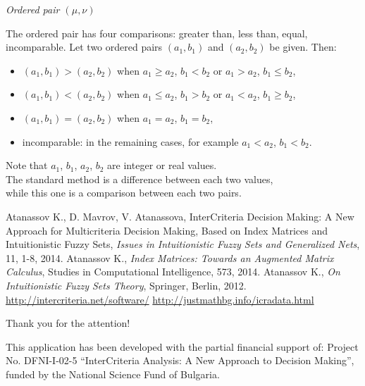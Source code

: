 \documentclass{beamer}
\begin{document}
\begin{frame}
\textit{Ordered pair $(\mu,\nu)$}

\bigskip
The ordered pair has four comparisons: greater than, less than, equal, incomparable.
Let two ordered pairs $(a_1,b_1)$ and $(a_2,b_2)$ be given. Then:
\begin{itemize}
\item $(a_1,b_1) > (a_2,b_2)$ when $a_1 \geq a_2$, $b_1 < b_2$ or $a_1 > a_2$, $b_1 \leq b_2$,
\item $(a_1,b_1) < (a_2,b_2)$ when $a_1 \leq a_2$, $b_1 > b_2$ or $a_1 < a_2$, $b_1 \geq b_2$,
\item $(a_1,b_1) = (a_2,b_2)$ when $a_1=a_2$, $b_1=b_2$,
\item incomparable: in the remaining cases, for example $a_1<a_2$, $b_1<b_2$.
\end{itemize}

\bigskip
Note that $a_1$, $b_1$, $a_2$, $b_2$ are integer or real values.\\
The standard method is a difference between each two values,\\
while this one is a comparison between each two pairs.
\end{frame}


\begin{frame}
\begin{thebibliography}{9}
 Atanassov K., D. Mavrov, V. Atanassova, InterCriteria Decision Making: A New Approach for Multicriteria Decision Making, Based on Index Matrices and Intuitionistic Fuzzy Sets, \textit{Issues in Intuitionistic Fuzzy Sets and Generalized Nets}, 11, 1-8, 2014.
 Atanassov K., \textit{Index Matrices: Towards an Augmented Matrix Calculus}, Studies in Computational Intelligence, 573, 2014.
 Atanassov K., \textit{On Intuitionistic Fuzzy Sets Theory}, Springer, Berlin, 2012.
 \url{http://intercriteria.net/software/}
 \url{http://justmathbg.info/icradata.html}
\end{thebibliography}
\end{frame}


\begin{frame}
\begin{center}
Thank you for the attention!
\end{center}

\vfill
This application has been developed with the partial financial support of:
Project No. DFNI-I-02-5 ``InterCriteria Analysis: A New Approach to Decision Making'',
funded by the National Science Fund of Bulgaria.
\end{frame}
\end{document}
